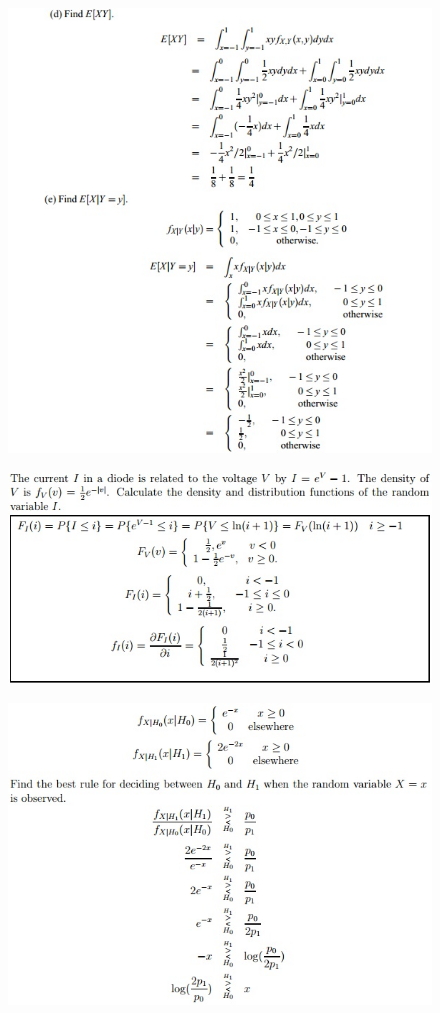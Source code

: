 \documentclass[11pt,landscape]{article}
\begin{document}
\begin{multicols}{3}
\begin{figure}[H]
    \includegraphics[scale=0.58]{./Images/2/joint2.jpg}
\end{figure}
\begin{figure}[H]
    \includegraphics[scale=0.53]{./Images/2/DenDisSolve.jpg}
\end{figure}
\begin{figure}[H]
    \includegraphics[scale=0.53]{./Images/2/Decision.jpg}
\end{figure}


\end{multicols}
\end{document}
